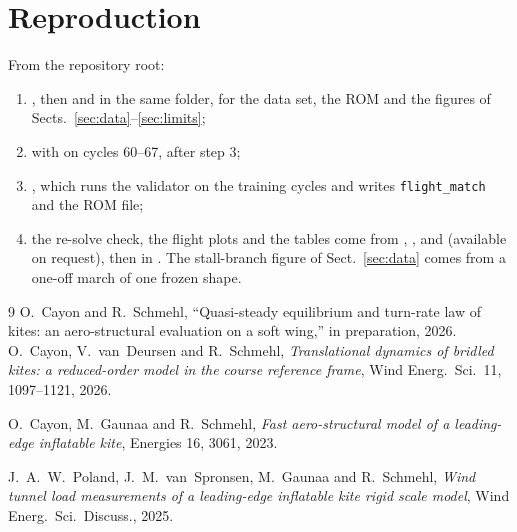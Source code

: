 \documentclass[11pt,a4paper]{article}
\newcommand{\code}[1]{\texttt{\small #1}}
\begin{document}
\section{Reproduction}
From the repository root:
\begin{enumerate}
  \item {}, then
         and  in the
        same folder, for the data set, the ROM and the figures of
        Sects.~\ref{sec:data}--\ref{sec:limits};
  \item {}
        with  on cycles 60--67, after step 3;
  \item {}, which runs the
        validator on the training cycles and writes \code{flight\_match} and the ROM file;
  \item the re-solve check, the flight plots and the tables come from
        , ,
         and  (available on
        request), then  in . The stall-branch
        figure of Sect.~\ref{sec:data} comes from a one-off march of one frozen shape.
\end{enumerate}

\begin{thebibliography}{9}
O.~Cayon and R.~Schmehl, ``Quasi-steady equilibrium and turn-rate law of kites: an
aero-structural evaluation on a soft wing,'' in preparation, 2026.
O.~Cayon, V.~van~Deursen and R.~Schmehl,
\emph{Translational dynamics of bridled kites: a reduced-order model in the
course reference frame}, Wind Energ.\ Sci.\ 11, 1097--1121, 2026.

O.~Cayon, M.~Gaunaa and R.~Schmehl,
\emph{Fast aero-structural model of a leading-edge inflatable kite},
Energies 16, 3061, 2023.

J.~A.~W.~Poland, J.~M.~van~Spronsen, M.~Gaunaa and R.~Schmehl,
\emph{Wind tunnel load measurements of a leading-edge inflatable kite rigid
scale model}, Wind Energ.\ Sci.\ Discuss., 2025.
\end{thebibliography}
\end{document}
